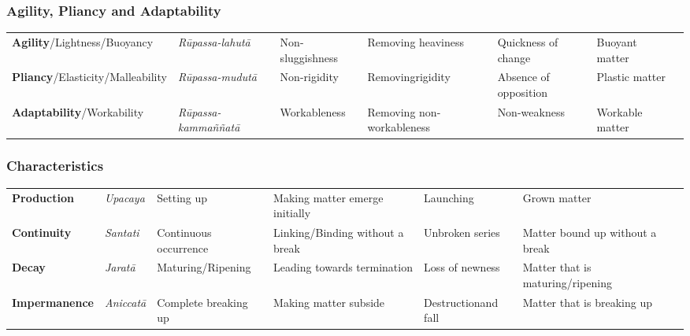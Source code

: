 \documentclass[a4 paper, 12pt]{article}
\begin{document}
\subsubsection*{\textbf{Agility}, \textbf{Pliancy} and \textbf{Adaptability}}

\setlength{\tabcolsep}{0pt}
\renewcommand{\arraystretch}{1.1}

\begin{tabular}{P{0.21\textwidth} | C{.13\textwidth} C{.165\textwidth} C{0.165\textwidth} C{0.165\textwidth} C{0.165\textwidth} m{0mm}}
\toprule
 &  &  &  &  & \\
\midrule
\textbf{Agility}/\newline Lightness/Buoyancy & \textit{Rūpassa-lahutā} & Non-sluggishness & Removing heaviness & Quickness of change & Buoyant matter &\\[9mm]
\textbf{Pliancy}/\newline Elasticity/Malleability & \textit{Rūpassa-mudutā} & Non-rigidity & Removing\newline rigidity & Absence of opposition & Plastic matter &\\[9mm]
\textbf{Adaptability}/\newline Workability & \textit{Rūpassa-kammaññatā} & Workableness & Removing non-workableness & Non-weakness & Workable matter &\\[9mm]
\bottomrule
\end{tabular} 

\subsubsection*{Characteristics}

\setlength{\tabcolsep}{0pt}
\renewcommand{\arraystretch}{1.1}

\begin{tabular}{P{0.21\textwidth} | C{.13\textwidth} C{.165\textwidth} C{0.165\textwidth} C{0.165\textwidth} C{0.165\textwidth} m{0mm}}
\toprule
 &  &  &  &  & \\
\midrule
\textbf{Production} & \textit{Upacaya} & Setting up & Making matter emerge initially & Launching & Grown matter &\\[9mm]
\textbf{Continuity} & \textit{Santati} & Continuous occurrence & Linking/Binding without a break & Unbroken series & Matter bound up without a break &\\[9mm]
\textbf{Decay} & \textit{Jaratā} & Maturing/\newline Ripening & Leading towards termination & Loss of newness & Matter that is maturing/ripening &\\[9mm]
\textbf{Impermanence} & \textit{Aniccatā} & Complete breaking up & Making matter subside & Destruction\newline and fall & Matter that is breaking up &\\[9mm]
\bottomrule
\end{tabular} 
\end{document}
